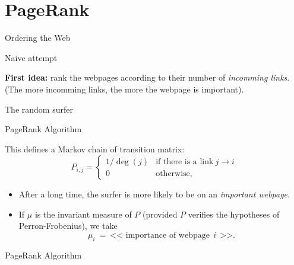 \documentclass{beamer}
\begin{document}
\section{PageRank}
\begin{frame}[t]{Ordering the Web}
	\grid
\end{frame}

\begin{frame}[t]{Naive attempt}
	\grid

	\textbf{First idea:} rank the webpages according to their number of \emph{incomming links}. (The more incomming links, the more the webpage is important).
\end{frame}

\begin{frame}[t]{The random surfer}
	\grid
\end{frame}

\begin{frame}[t]{PageRank Algorithm}
	\grid

	This defines a Markov chain of transition matrix:
	$$
	P_{i,j} 
	= 
	\begin{cases}
		1 / \deg(j) & \text{if there is a link} \ j \to i \\
		0 & \text{otherwise},
	\end{cases}
	$$

	\vspace{0.6cm}
	\begin{itemize}
		\item After a long time, the surfer is more likely to be on an \emph{important webpage}.
			\vspace{0.3cm}
		\item If $\mu$ is the invariant measure of $P$ (provided $P$ verifies the hypotheses of Perron-Frobenius), we take
			$$
			\mu_i  \ = \ \text{<< importance of webpage}  \ \ i \ \ \text{>>}.
			$$
	\end{itemize}

\end{frame}


\begin{frame}[t]{PageRank Algorithm}
	\grid


\end{frame}
\end{document}
